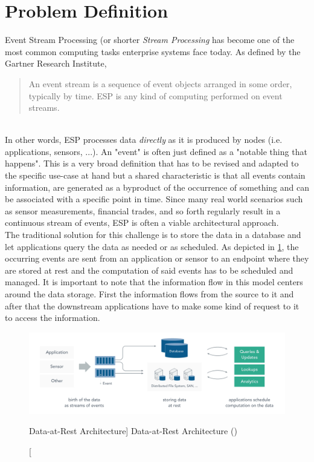\section{Problem Definition}

Event Stream Processing (or shorter \textit{Stream Processing} has become one of the most common computing tasks enterprise systems face today. As defined by the Gartner Research Institute,
\blockquote{An event stream is a sequence of event objects arranged in some order, typically by time. \acf{ESP} is any kind of computing performed on event streams.}\autocite{Schulte2017TechnologyProcessing}\\
In other words, \acf{ESP} processes data \textit{directly} as it is produced by nodes (i.e. applications, sensors, ...). An "event" is often just defined as a "notable thing that happens".\autocite{Michelson2011ElementalOverview} This is a very broad definition that has to be revised and adapted to the specific use-case at hand but a shared characteristic is that all events contain information, are generated as a byproduct of the occurrence of something and can be associated with a specific point in time. 
Since many real world scenarios such as sensor measurements, financial trades, and so forth regularly result in a continuous stream of events, \acf{ESP} is often a viable architectural approach.\\
The traditional solution for this challenge is to store the data in a database and let applications query the data as needed or as scheduled. As depicted in \ref{fig:dataRest}, the occurring events are sent from an application or sensor to an endpoint where they are stored at rest and the computation of said events has to be scheduled and managed. It is important to note that the information flow in this model centers around the data storage. First the information flows from the source to it and after that the downstream applications have to make some kind of request to it to access the information.

\begin{figure}[ht]
    \includegraphics[width=\linewidth]{images/streaming/data_at_rest.png}\centering
    \caption
    [Data-at-Rest Architecture]
    {Data-at-Rest Architecture (\cite{dataArtisans2017WhatProcessing})}
    \label{fig:dataRest}
\end{figure}

